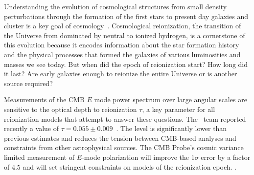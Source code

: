 \vspace{-0.05in}

Understanding the evolution of cosmological structures from small density perturbations through the formation of the
first stars to present day galaxies and cluster is a key goal of cosmology~\cite{dunlop2011}. 
Cosmological reionization, the transition of the Universe from dominated by neutral to ionized 
hydrogen, is a cornerstone of this evolution because it encodes information 
about the star formation history and the physical processes that formed the galaxies of various luminosities and masses we see today. 
But when did the epoch of reionization start?  How long did it last? Are early galaxies enough to reionize the entire Universe
or is another source required?
 
Measurements of the \ac{CMB} $E$ mode power spectrum over large angular scales are sensitive to the optical depth 
to reionization $\tau$, a key parameter for all reionization models that attempt to answer these questions. 
The \planck\ team  reported recently a value of $\tau=0.055 \pm 0.009$~\cite{planck2015-XLVI,planck2015-XXXI}.
The level is significantly lower than previous estimates and reduces the tension between CMB-based analyses and constraints from 
other astrophysical sources. The CMB Probe's cosmic variance limited measurement of $E$-mode polarization will 
improve the $1\sigma$ error by a factor of 4.5 and will 
set stringent constraints on models of the reionization epoch. .



